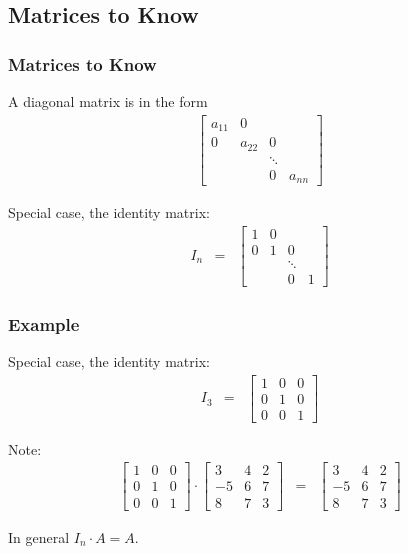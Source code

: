 \subsection{Matrices to Know}

\begin{frame}
  \frametitle{Matrices to Know}
  
  A diagonal matrix is in the form
  \begin{eqnarray*}
    \left[
      \begin{array}{rrrr}
        a_{11} & 0 & \\
        0 & a_{22} & 0 \\
        & & \ddots & \\
        & & 0 & a_{nn}
      \end{array}
    \right]
  \end{eqnarray*}

  Special case, the identity matrix:
  \begin{eqnarray*}
    I_n & = & 
    \left[
      \begin{array}{rrrr}
        1 & 0 & \\
        0 & 1 & 0 \\
        & & \ddots & \\
        & & 0 & 1
      \end{array}
    \right]
  \end{eqnarray*}

\end{frame}


\begin{frame}
  \frametitle{Example}
  
  Special case, the identity matrix:
  \begin{eqnarray*}
    I_3 & = & 
    \left[
      \begin{array}{rrr}
        1 & 0 & 0\\
        0 & 1 & 0 \\
        0 & 0 & 1
      \end{array}
    \right]
  \end{eqnarray*}

  Note:
  \begin{eqnarray*}
    \left[
      \begin{array}{rrr}
        1 & 0 & 0 \\
        0 & 1 & 0 \\
        0 & 0 & 1
      \end{array}
    \right] \cdot
       \left[
      \begin{array}{rrr}
        3 & 4 & 2 \\
        -5 & 6 & 7 \\
        8 & 7 & 3
      \end{array}
    \right] & = & 
       \left[
      \begin{array}{rrr}
        3 & 4 & 2 \\
        -5 & 6 & 7 \\
        8 & 7 & 3
      \end{array}
    \right] 
  \end{eqnarray*}

  In general $I_n\cdot A = A$.

\end{frame}


